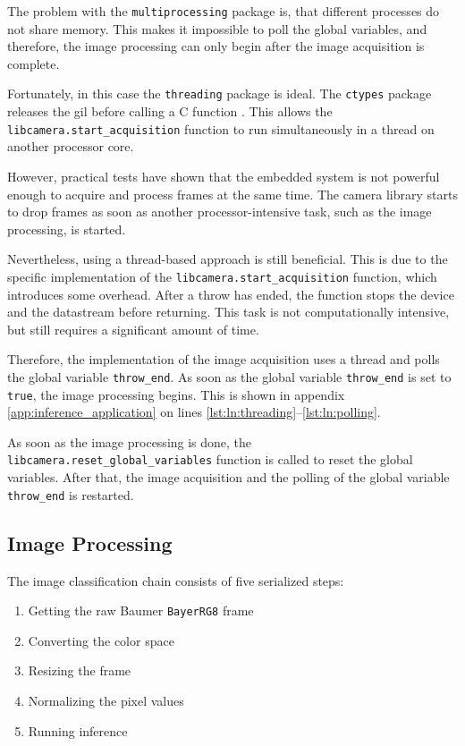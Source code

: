 The problem with the \texttt{multiprocessing} package is, that different processes do not share memory.
This makes it impossible to poll the global variables, and therefore, the image processing can only begin after the image acquisition is complete.

Fortunately, in this case the \texttt{threading} package is ideal.
The \texttt{ctypes} package releases the \acrshort{gil} before calling a C function \cite{inf_ctypes_gil}.
This allows the \texttt{libcamera.start\_acquisition} function to run simultaneously in a thread on another processor core.

However, practical tests have shown that the embedded system is not powerful enough to acquire and process frames at the same time.
The camera library starts to drop frames as soon as another processor-intensive task, such as the image processing, is started.

Nevertheless, using a thread-based approach is still beneficial.
This is due to the specific implementation of the \texttt{libcamera.start\_acquisition} function, which introduces some overhead.
After a throw has ended, the function stops the device and the datastream before returning.
This task is not computationally intensive, but still requires a significant amount of time.

Therefore, the implementation of the image acquisition uses a thread and polls the global variable \texttt{throw\_end}.
As soon as the global variable \texttt{throw\_end} is set to \texttt{true}, the image processing begins.
This is shown in appendix \ref{app:inference_application} on lines \ref{lst:ln:threading}--\ref{lst:ln:polling}.

As soon as the image processing is done, the \texttt{libcamera.reset\_global\_variables} function is called to reset the global variables.
After that, the image acquisition and the polling of the global variable \texttt{throw\_end} is restarted.

\subsection{Image Processing}
\label{subsec:inference:app:image_processing}

The image classification chain consists of five serialized steps:

\begin{enumerate}
  \item Getting the raw Baumer \texttt{BayerRG8} frame
  \item Converting the color space
  \item Resizing the frame
  \item Normalizing the pixel values
  \item Running inference
\end{enumerate}

